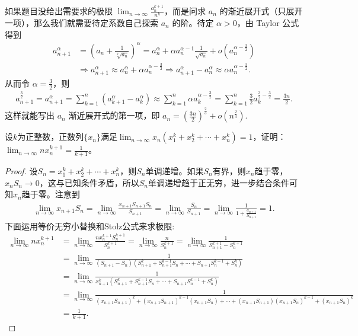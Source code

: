 \documentclass[../../main.tex]{subfiles}
\begin{document}
\begin{remark}
如果题目没给出需要求的极限 \(\lim_{n\rightarrow \infty} \frac{a_{n}^{k + 1}}{n^k}\)，而是问求 \(a_n\) 的渐近展开式（只展开一项），那么我们就需要待定系数自己探索 \(a_n\) 的阶。待定 \(\alpha>0\)，由 Taylor 公式得到
\begin{align*}
a_{n + 1}^{\alpha}&=\left(a_n+\frac{1}{\sqrt[k]{a_n}}\right)^{\alpha}
=a_n^{\alpha}+\alpha a_n^{\alpha - 1}\frac{1}{\sqrt{a_n}}+o\left(a_n^{\alpha - \frac{3}{2}}\right)\\
&\Rightarrow a_{n + 1}^{\alpha}\approx a_n^{\alpha}+\alpha a_n^{\alpha - \frac{3}{2}}
\Rightarrow a_{n + 1}^{\alpha}-a_n^{\alpha}\approx \alpha a_n^{\alpha - \frac{3}{2}}.
\end{align*}
从而令 \(\alpha = \frac{3}{2}\)，则
\begin{align*}
a_{n + 1}^{\frac{3}{2}}=a_{n + 1}^{\alpha}
=\sum_{k = 1}^n\left(a_{k + 1}^{\alpha}-a_{k}^{\alpha}\right)
\approx \sum_{k = 1}^n\alpha a_{k}^{\alpha - \frac{3}{2}}
=\sum_{k = 1}^n\frac{3}{2}a_{k}^{\frac{3}{2}-\frac{3}{2}}
=\frac{3n}{2}.
\end{align*}
这样就能写出 \(a_n\) 渐近展开式的第一项，即 \(a_n=\left(\frac{3n}{2}\right)^{\frac{2}{3}}+o\left(n^{\frac{2}{3}}\right)\).
\end{remark}

\begin{example}
设\(k\)为正整数，正数列\(\{x_n\}\)满足\(\lim_{n\rightarrow\infty}x_n(x_1^k + x_2^k+\cdots+x_n^k)=1\)，证明：\(\lim_{n\rightarrow\infty}nx_n^{k + 1}=\frac{1}{k + 1}\)。
\end{example}
\begin{proof}
设\(S_n = x_1^k + x_2^k+\cdots+x_n^k\)，则\(S_n\)单调递增。如果\(S_n\)有界，则\(x_n\)趋于零，\(x_nS_n\rightarrow0\)，这与已知条件矛盾，所以\(S_n\)单调递增趋于正无穷，进一步结合条件可知\(x_n\)趋于零。注意到
\begin{align*}
\lim_{n\rightarrow\infty}x_{n + 1}S_n=\lim_{n\rightarrow\infty}\frac{x_{n + 1}S_{n + 1}S_n}{S_{n + 1}}=\lim_{n\rightarrow\infty}\frac{S_n}{S_{n + 1}}=\lim_{n\rightarrow\infty}\frac{1}{1+\frac{a_{n + 1}}{S_{n + 1}}}=1.
\end{align*}
下面运用等价无穷小替换和Stolz公式来求极限:
\begin{align*}
\lim_{n\rightarrow\infty}nx_n^{k + 1}&=\lim_{n\rightarrow\infty}\frac{nx_n^{k + 1}S_n^{k + 1}}{S_n^{k + 1}}=\lim_{n\rightarrow\infty}\frac{n}{S_n^{k + 1}}=\lim_{n\rightarrow\infty}\frac{1}{S_{n + 1}^{k + 1}-S_n^{k + 1}}\\
&=\lim_{n\rightarrow\infty}\frac{1}{(S_{n + 1}-S_n)(S_{n + 1}^k + S_{n + 1}^{k - 1}S_n+\cdots+S_{n + 1}S_n^{k - 1}+S_n^k)}\\
&=\lim_{n\rightarrow\infty}\frac{1}{x_{n + 1}^{k}(S_{n + 1}^k + S_{n + 1}^{k - 1}S_n+\cdots+S_{n + 1}S_n^{k - 1}+S_n^k)}\\
&=\lim_{n\rightarrow\infty}\frac{1}{(x_{n + 1}S_{n + 1})^k+(x_{n + 1}S_{n + 1})^{k - 1}(x_{n + 1}S_n)+\cdots+(x_{n + 1}S_{n + 1})(x_{n + 1}S_n)^{k - 1}+(x_{n + 1}S_n)^k}\\
&=\frac{1}{k + 1}.
\end{align*}
\end{proof}
\end{document}
